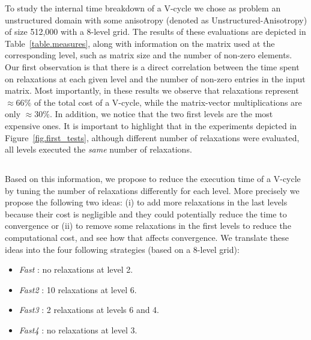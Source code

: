 To study the internal time breakdown of a V-cycle we chose as problem an
unstructured domain with some anisotropy (denoted as Unstructured-Anisotropy)
of size 512,000 with a 8-level grid. The results of these evaluations are
depicted in Table~\ref{table.measures}, along with information on the matrix
used at the corresponding level, such as matrix size and the number of non-zero
elements.  Our first observation is that there is a direct correlation between
the time spent on relaxations at each given level and the number of non-zero
entries in the input matrix. Most importantly, in these results we observe that
relaxations represent $\approx66\%$ of the total cost of a V-cycle, while the
matrix-vector multiplications are only $\approx30\%$. In addition, we notice
that the two first levels are the most expensive ones.  It is important to
highlight that in the experiments depicted in Figure~\ref{fig.first_tests},
although different number of relaxations were evaluated, all levels executed
the \emph{same} number of relaxations.

\subsection{}

Based on this information, we propose to reduce the execution time of a V-cycle
by tuning the number of relaxations differently for each level. More precisely
we propose the following two ideas: (i) to add more relaxations in the last
levels because their cost is negligible and they could potentially reduce the
time to convergence or (ii) to remove some relaxations in the first levels to
reduce the computational cost, and see how that affects convergence. We
translate these ideas into the four following strategies (based on a 8-level
grid):

\begin{itemize}
    \item \emph{Fast } : no relaxations at level 2.
    \item \emph{Fast2} : 10 relaxations at level 6.
    \item \emph{Fast3} :  2 relaxations at levels 6 and 4.
    \item \emph{Fast4} : no relaxations at level 3.
\end{itemize}


